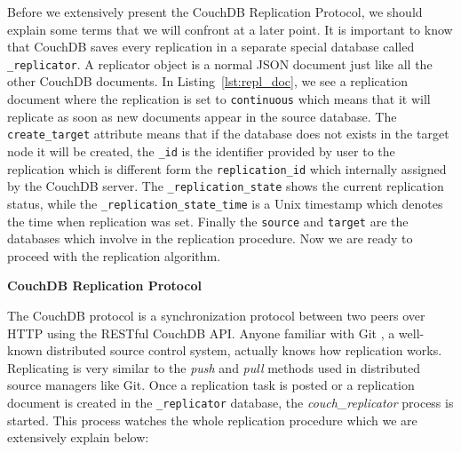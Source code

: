 \begin{description}
    Before we extensively present the CouchDB Replication Protocol, we should
    explain some terms that we will confront at a later point. It is important
    to know that CouchDB saves every replication in a separate special database
    called \texttt{\_replicator}. A replicator object is a normal JSON document
    just like all the other CouchDB documents. In Listing~\ref{lst:repl_doc},
    we see a replication document where the replication is set to
    \texttt{continuous} which means that it will replicate as soon as new
    documents appear in the source database. The \texttt{create\_target}
    attribute means that if the database does not exists in the target node
    it will be created, the \texttt{\_id} is the identifier provided by user to
    the replication which is different form the \texttt{replication\_id} which
    internally assigned by the CouchDB server. The \texttt{\_replication\_state}
    shows the current replication status, while the
    \texttt{\_replication\_state\_time} is a Unix timestamp which denotes the
    time when replication was set. Finally the \texttt{source} and \texttt{target}
    are the databases which involve in the replication procedure. Now we are
    ready to proceed with the replication algorithm.


    \textbf{CouchDB Replication Protocol}

    The CouchDB protocol is a synchronization protocol between two peers over
    HTTP using the RESTful CouchDB API. Anyone familiar with Git
    , a well-known distributed source control system,
    actually knows how replication works. Replicating is very similar to the
    \emph{push} and \emph{pull} methods used in distributed source managers like
    Git. Once a replication task is posted or a replication document is created
    in the \texttt{\_replicator} database, the \emph{couch\_replicator} process
    is started. This process watches the whole replication procedure which we
    are extensively explain below:


\end{description}
